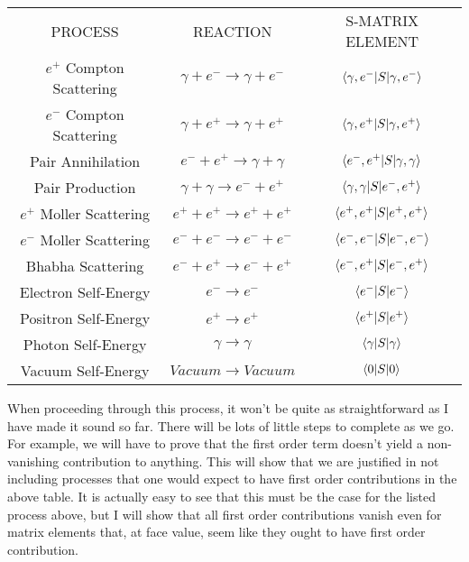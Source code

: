 \documentclass[a4]{article}
\begin{document}
        \begin{center}
            \begin{tabular}{|c c c|}
                \hline
                PROCESS & REACTION & S-MATRIX ELEMENT \\
                $e^{+}$ Compton Scattering & $\gamma + e^{-} \rightarrow \gamma + e^{-}$ & $\braket{\gamma , e^{-}|S|\gamma , e^{-}}$ \\
                $e^{-}$ Compton Scattering & $\gamma + e^{+} \rightarrow \gamma + e^{+}$ & $\braket{\gamma , e^{+}|S|\gamma , e^{+}}$ \\
                Pair Annihilation & $e^{-} + e^{+} \rightarrow \gamma + \gamma$ & $\braket{e^{-} , e^{+}|S|\gamma , \gamma}$ \\
                Pair Production & $\gamma + \gamma \rightarrow e^{-} + e^{+}$ & $\braket{\gamma , \gamma|S|e^{-} , e^{+}}$ \\
                $e^{+}$ Moller Scattering & $e^{+} + e^{+} \rightarrow e^{+} + e^{+}$ & $\braket{e^{+} , e^{+}|S|e^{+} , e^{+}}$ \\
                $e^{-}$ Moller Scattering & $e^{-} + e^{-} \rightarrow e^{-} + e^{-}$ & $\braket{e^{-} , e^{-}|S|e^{-} , e^{-}}$ \\
                Bhabha Scattering & $e^{-} + e^{+} \rightarrow e^{-} + e^{+}$ & $\braket{e^{-} , e^{+}|S|e^{-} , e^{+}}$ \\
                Electron Self-Energy & $e^{-} \rightarrow e^{-}$ & $\braket{e^{-}|S|e^{-}}$ \\
                Positron Self-Energy & $e^{+} \rightarrow e^{+}$ & $\braket{e^{+}|S|e^{+}}$ \\
                Photon Self-Energy & $\gamma \rightarrow \gamma$ & $\braket{\gamma|S|\gamma}$ \\
                Vacuum Self-Energy & $Vacuum \rightarrow Vacuum$ & $\braket{0|S|0}$ \\
                \hline
            \end{tabular}
        \end{center}

        \vspace{0.75cm}

        When proceeding through this process, it won't be quite as straightforward as I have made it sound so far.
        There will be lots of little steps to complete as we go. For example, we will have to prove that the first
        order term doesn't yield a non-vanishing contribution to anything. This will show that we are justified in
        not including processes that one would expect to have first order contributions in the above table. It is
        actually easy to see that this must be the case for the listed process above, but I will show that all first
        order contributions vanish even for matrix elements that, at face value, seem like they ought to have first
        order contribution.
\end{document}

